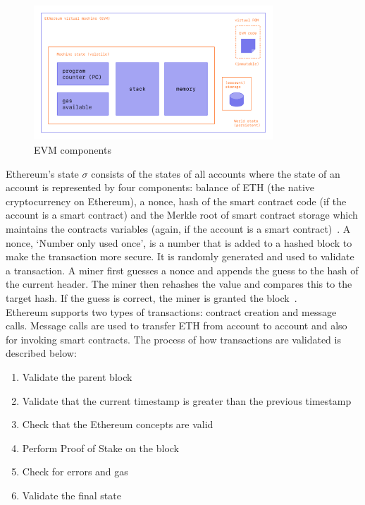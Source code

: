 \begin{figure}[!htb]
    \centering
    \includegraphics[width=0.8\textwidth]{background/Images/evm.png}
    \caption{EVM components~\cite{noauthor_ethereum_nodate}}
\end{figure}

\noindent Ethereum's state $\sigma$ consists of the states of all accounts where the state of an account is represented by four components: balance of ETH (the native cryptocurrency on Ethereum), a nonce, hash of the smart contract code (if the account is a smart contract) and the Merkle root of smart contract storage which maintains the contracts variables (again, if the account is a smart contract)~\cite{ethereum_yellowpaper}. A nonce, `Number only used once', is a number that is added to a hashed block to make the transaction more secure. It is randomly generated and used to validate a transaction. A miner first guesses a nonce and appends the guess to the hash of the current header. The miner then rehashes the value and compares this to the target hash. If the guess is correct, the miner is granted the block~\cite{noauthor_components_2021}.
\\[3mm]
Ethereum supports two types of transactions: contract creation and message calls. Message calls are used to transfer ETH from account to account and also for invoking smart contracts. The process of how transactions are validated is described below:
\begin{enumerate}
    \itemsep0em
    \item Validate the parent block
    \item Validate that the current timestamp is greater than the previous timestamp
    \item Check that the Ethereum concepts are valid
    \item Perform Proof of Stake on the block
    \item Check for errors and gas
    \item Validate the final state
\end{enumerate}

